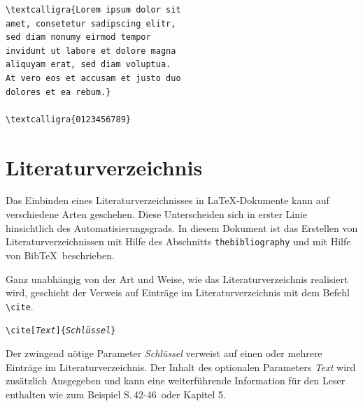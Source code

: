 \documentclass[a4paper,10pt,twoside]{scrbook}
\begin{document}
\begin{minipage}[h]{0.54\textwidth}
\setlength{\parskip}{1em}
\frenchspacing
\begin{Verbatim}[frame=single]
\textcalligra{Lorem ipsum dolor sit 
amet, consetetur sadipscing elitr, 
sed diam nonumy eirmod tempor 
invidunt ut labore et dolore magna 
aliquyam erat, sed diam voluptua. 
At vero eos et accusam et justo duo 
dolores et ea rebum.}

\textcalligra{0123456789}
\end{Verbatim}
\end{minipage}
\hfill
\begin{minipage}[h]{0.38\textwidth}
\setlength{\parskip}{1em}
\frenchspacing
{}

\end{minipage}


\chapter{Literaturverzeichnis}
\label{Kapitel_Literaturverzeichnis}

Das Einbinden eines Literaturverzeichnisses in \LaTeX-Dokumente kann auf verschiedene Arten geschehen. Diese Unterscheiden sich in erster Linie hinsichtlich des Automatisierungsgrads. In diesem Dokument ist das Erstellen von Literaturverzeichnissen mit Hilfe des Abschnitts \verb!thebibliography! und mit Hilfe von Bib\TeX\ beschrieben.

Ganz unabhängig von der Art und Weise, wie das Literaturverzeichnis realisiert wird, geschieht der Verweis auf Einträge im Literaturverzeichnis mit dem Befehl \verb|\cite|.

\begin{boxedminipage}{\textwidth}
	\texttt{\textbackslash cite[\textsl{Text}]\{\textsl{Schlüssel}\}} 
\end{boxedminipage}

Der zwingend nötige Parameter \textsl{Schlüssel} verweist auf einen oder mehrere Einträge im Literaturverzeichnis. Der Inhalt des optionalen Parameters  \textsl{Text} wird zusätzlich Ausgegeben und kann eine weiterführende Information für den Leser enthalten wie zum Beispiel \glqq S.\,42-46\grqq\ oder \glqq Kapitel 5\grqq.
\end{document}
